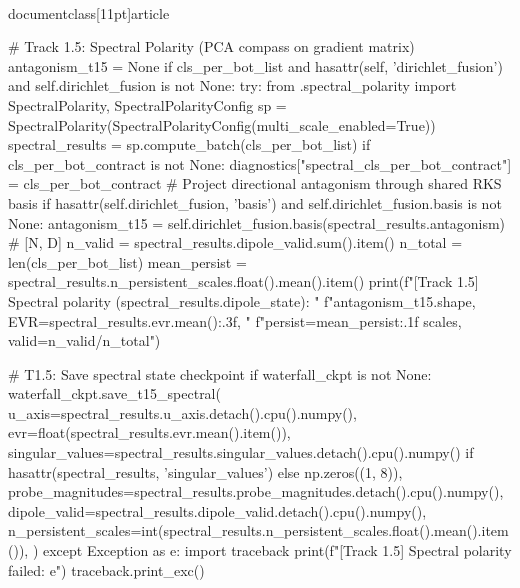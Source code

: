 \\documentclass[11pt]{article}
\begin{document}
\begin{CodeBlock}
                # Track 1.5: Spectral Polarity (PCA compass on gradient matrix)
                antagonism_t15 = None
                if cls_per_bot_list and hasattr(self, 'dirichlet_fusion') and self.dirichlet_fusion is not None:
                    try:
                        from .spectral_polarity import SpectralPolarity, SpectralPolarityConfig
                        sp = SpectralPolarity(SpectralPolarityConfig(multi_scale_enabled=True))
                        spectral_results = sp.compute_batch(cls_per_bot_list)
                        if cls_per_bot_contract is not None:
                            diagnostics["spectral_cls_per_bot_contract"] = cls_per_bot_contract
                        # Project directional antagonism through shared RKS basis
                        if hasattr(self.dirichlet_fusion, 'basis') and self.dirichlet_fusion.basis is not None:
                            antagonism_t15 = self.dirichlet_fusion.basis(spectral_results.antagonism)  # [N, D]
                            n_valid = spectral_results.dipole_valid.sum().item()
                            n_total = len(cls_per_bot_list)
                            mean_persist = spectral_results.n_persistent_scales.float().mean().item()
                            print(f"[Track 1.5] Spectral polarity ({spectral_results.dipole_state}): "
                                  f"{antagonism_t15.shape}, EVR={spectral_results.evr.mean():.3f}, "
                                  f"persist={mean_persist:.1f} scales, valid={n_valid}/{n_total}")

                            # T1.5: Save spectral state checkpoint
                            if waterfall_ckpt is not None:
                                waterfall_ckpt.save_t15_spectral(
                                    u_axis=spectral_results.u_axis.detach().cpu().numpy(),
                                    evr=float(spectral_results.evr.mean().item()),
                                    singular_values=spectral_results.singular_values.detach().cpu().numpy() if hasattr(spectral_results, 'singular_values') else np.zeros((1, 8)),
                                    probe_magnitudes=spectral_results.probe_magnitudes.detach().cpu().numpy(),
                                    dipole_valid=spectral_results.dipole_valid.detach().cpu().numpy(),
                                    n_persistent_scales=int(spectral_results.n_persistent_scales.float().mean().item()),
                                )
                    except Exception as e:
                        import traceback
                        print(f"[Track 1.5] Spectral polarity failed: {e}")
                        traceback.print_exc()


\end{CodeBlock}
\end{document}
